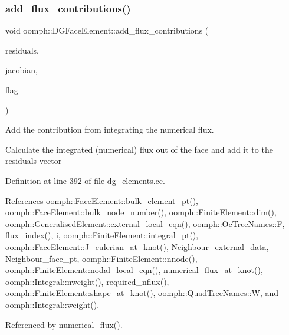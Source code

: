 \subsubsection{\texorpdfstring{add\+\_\+flux\+\_\+contributions()}{add\_flux\_contributions()}}
{\footnotesize\ttfamily void oomph\+::\+D\+G\+Face\+Element\+::add\+\_\+flux\+\_\+contributions (\begin{DoxyParamCaption}\item[{\hyperlink{classoomph_1_1Vector}{Vector}$<$ double $>$ \&}]{residuals,  }\item[{\hyperlink{classoomph_1_1DenseMatrix}{Dense\+Matrix}$<$ double $>$ \&}]{jacobian,  }\item[{unsigned}]{flag }\end{DoxyParamCaption})}



Add the contribution from integrating the numerical flux. 

Calculate the integrated (numerical) flux out of the face and add it to the residuals vector 

Definition at line 392 of file dg\+\_\+elements.\+cc.



References oomph\+::\+Face\+Element\+::bulk\+\_\+element\+\_\+pt(), oomph\+::\+Face\+Element\+::bulk\+\_\+node\+\_\+number(), oomph\+::\+Finite\+Element\+::dim(), oomph\+::\+Generalised\+Element\+::external\+\_\+local\+\_\+eqn(), oomph\+::\+Oc\+Tree\+Names\+::F, flux\+\_\+index(), i, oomph\+::\+Finite\+Element\+::integral\+\_\+pt(), oomph\+::\+Face\+Element\+::\+J\+\_\+eulerian\+\_\+at\+\_\+knot(), Neighbour\+\_\+external\+\_\+data, Neighbour\+\_\+face\+\_\+pt, oomph\+::\+Finite\+Element\+::nnode(), oomph\+::\+Finite\+Element\+::nodal\+\_\+local\+\_\+eqn(), numerical\+\_\+flux\+\_\+at\+\_\+knot(), oomph\+::\+Integral\+::nweight(), required\+\_\+nflux(), oomph\+::\+Finite\+Element\+::shape\+\_\+at\+\_\+knot(), oomph\+::\+Quad\+Tree\+Names\+::W, and oomph\+::\+Integral\+::weight().



Referenced by numerical\+\_\+flux().

\mbox{\label{classoomph_1_1DGFaceElement_aa905f22c530f3f640373eccbe90874b8}} 
